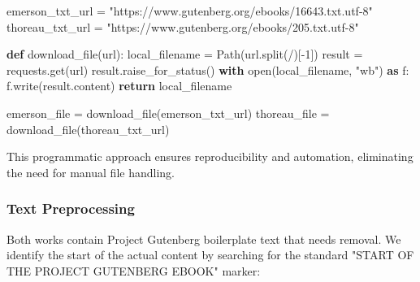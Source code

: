\documentclass[
]{article}
\newenvironment{Shaded}{}{}
\newcommand{\BuiltInTok}[1]{\textcolor[rgb]{0.00,0.50,0.00}{#1}}
\newcommand{\ControlFlowTok}[1]{\textcolor[rgb]{0.00,0.44,0.13}{\textbf{#1}}}
\newcommand{\DecValTok}[1]{\textcolor[rgb]{0.25,0.63,0.44}{#1}}
\newcommand{\ImportTok}[1]{\textcolor[rgb]{0.00,0.50,0.00}{\textbf{#1}}}
\newcommand{\KeywordTok}[1]{\textcolor[rgb]{0.00,0.44,0.13}{\textbf{#1}}}
\newcommand{\NormalTok}[1]{#1}
\newcommand{\OperatorTok}[1]{\textcolor[rgb]{0.40,0.40,0.40}{#1}}
\newcommand{\StringTok}[1]{\textcolor[rgb]{0.25,0.44,0.63}{#1}}
\begin{document}
\begin{Shaded}
\begin{Highlighting}[]
\NormalTok{emerson\_txt\_url }\OperatorTok{=} \StringTok{"https://www.gutenberg.org/ebooks/16643.txt.utf{-}8"}
\NormalTok{thoreau\_txt\_url }\OperatorTok{=} \StringTok{"https://www.gutenberg.org/ebooks/205.txt.utf{-}8"}

\KeywordTok{def}\NormalTok{ download\_file(url):}
\NormalTok{    local\_filename }\OperatorTok{=}\NormalTok{ Path(url.split(}\StringTok{\textquotesingle{}/\textquotesingle{}}\NormalTok{)[}\OperatorTok{{-}}\DecValTok{1}\NormalTok{])}
\NormalTok{    result }\OperatorTok{=}\NormalTok{ requests.get(url)}
\NormalTok{    result.raise\_for\_status()}
    \ControlFlowTok{with} \BuiltInTok{open}\NormalTok{(local\_filename, }\StringTok{"wb"}\NormalTok{) }\ImportTok{as}\NormalTok{ f:}
\NormalTok{        f.write(result.content)}
    \ControlFlowTok{return}\NormalTok{ local\_filename}
    
\NormalTok{emerson\_file }\OperatorTok{=}\NormalTok{ download\_file(emerson\_txt\_url)}
\NormalTok{thoreau\_file }\OperatorTok{=}\NormalTok{ download\_file(thoreau\_txt\_url)}
\end{Highlighting}
\end{Shaded}

This programmatic approach ensures reproducibility and automation,
eliminating the need for manual file handling.

\subsubsection{Text Preprocessing}\label{text-preprocessing}

Both works contain Project Gutenberg boilerplate text that needs
removal. We identify the start of the actual content by searching for
the standard "START OF THE PROJECT GUTENBERG EBOOK" marker:
\end{document}
